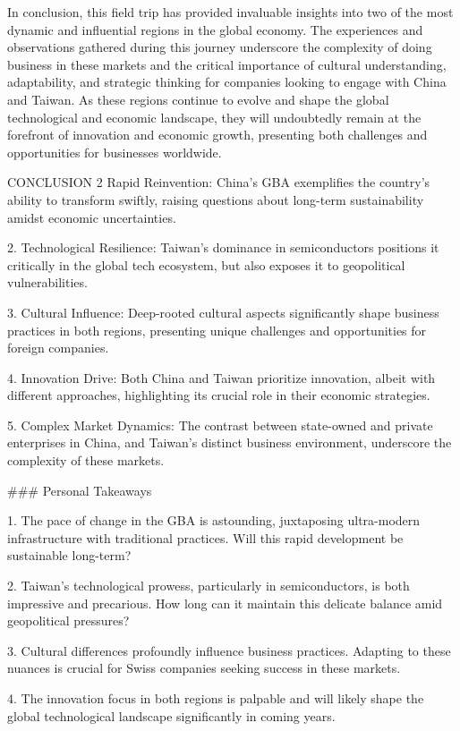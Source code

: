 In conclusion, this field trip has provided invaluable insights into two of the most dynamic and influential regions in the global economy. The experiences and observations gathered during this journey underscore the complexity of doing business in these markets and the critical importance of cultural understanding, adaptability, and strategic thinking for companies looking to engage with China and Taiwan. As these regions continue to evolve and shape the global technological and economic landscape, they will undoubtedly remain at the forefront of innovation and economic growth, presenting both challenges and opportunities for businesses worldwide.



CONCLUSION 2
Rapid Reinvention: China's GBA exemplifies the country's ability to transform swiftly, raising questions about long-term sustainability amidst economic uncertainties.

2. Technological Resilience: Taiwan's dominance in semiconductors positions it critically in the global tech ecosystem, but also exposes it to geopolitical vulnerabilities.

3. Cultural Influence: Deep-rooted cultural aspects significantly shape business practices in both regions, presenting unique challenges and opportunities for foreign companies.

4. Innovation Drive: Both China and Taiwan prioritize innovation, albeit with different approaches, highlighting its crucial role in their economic strategies.

5. Complex Market Dynamics: The contrast between state-owned and private enterprises in China, and Taiwan's distinct business environment, underscore the complexity of these markets.

### Personal Takeaways

1. The pace of change in the GBA is astounding, juxtaposing ultra-modern infrastructure with traditional practices. Will this rapid development be sustainable long-term?

2. Taiwan's technological prowess, particularly in semiconductors, is both impressive and precarious. How long can it maintain this delicate balance amid geopolitical pressures?

3. Cultural differences profoundly influence business practices. Adapting to these nuances is crucial for Swiss companies seeking success in these markets.

4. The innovation focus in both regions is palpable and will likely shape the global technological landscape significantly in coming years.

